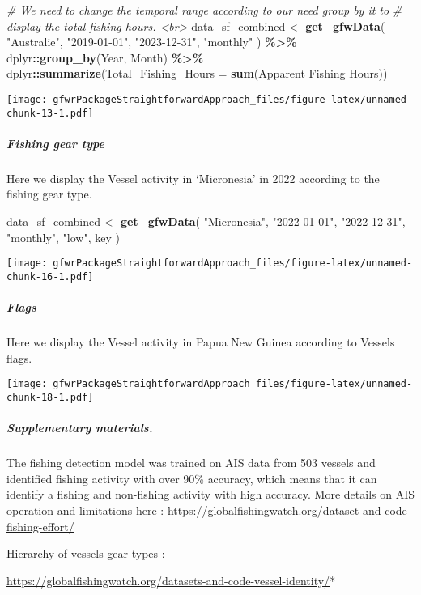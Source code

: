 \documentclass[
]{article}
\newenvironment{Shaded}{\begin{snugshade}}{\end{snugshade}}
\newcommand{\AttributeTok}[1]{\textcolor[rgb]{0.13,0.29,0.53}{#1}}
\newcommand{\CommentTok}[1]{\textcolor[rgb]{0.56,0.35,0.01}{\textit{#1}}}
\newcommand{\FunctionTok}[1]{\textcolor[rgb]{0.13,0.29,0.53}{\textbf{#1}}}
\newcommand{\NormalTok}[1]{#1}
\newcommand{\OtherTok}[1]{\textcolor[rgb]{0.56,0.35,0.01}{#1}}
\newcommand{\SpecialCharTok}[1]{\textcolor[rgb]{0.81,0.36,0.00}{\textbf{#1}}}
\newcommand{\StringTok}[1]{\textcolor[rgb]{0.31,0.60,0.02}{#1}}
\begin{document}
\begin{Shaded}
\begin{Highlighting}[]
\CommentTok{\# We need to change the temporal range according to our need group by it to}
\CommentTok{\# display the total fishing hours. \textless{}br\textgreater{}}
\NormalTok{data\_sf\_combined }\OtherTok{\textless{}{-}} \FunctionTok{get\_gfwData}\NormalTok{(}
  \StringTok{"Australie"}\NormalTok{,}
  \StringTok{"2019{-}01{-}01"}\NormalTok{,}
  \StringTok{"2023{-}12{-}31"}\NormalTok{,}
  \StringTok{"monthly"}
\NormalTok{) }\SpecialCharTok{\%\textgreater{}\%}
\NormalTok{  dplyr}\SpecialCharTok{::}\FunctionTok{group\_by}\NormalTok{(Year, Month) }\SpecialCharTok{\%\textgreater{}\%}
\NormalTok{  dplyr}\SpecialCharTok{::}\FunctionTok{summarize}\NormalTok{(}\AttributeTok{Total\_Fishing\_Hours =} \FunctionTok{sum}\NormalTok{(}\StringTok{\textasciigrave{}}\AttributeTok{Apparent Fishing Hours}\StringTok{\textasciigrave{}}\NormalTok{))}
\end{Highlighting}
\end{Shaded}

\texttt{[image: gfwrPackageStraightforwardApproach\_files/figure-latex/unnamed-chunk-13-1.pdf]}

\hypertarget{fishing-gear-type}{%
\subparagraph{Fishing gear type}\label{fishing-gear-type}}

Here we display the Vessel activity in `Micronesia' in 2022 according to
the fishing gear type.

\begin{Shaded}
\begin{Highlighting}[]
\NormalTok{data\_sf\_combined }\OtherTok{\textless{}{-}} \FunctionTok{get\_gfwData}\NormalTok{(}
  \StringTok{"Micronesia"}\NormalTok{,}
  \StringTok{"2022{-}01{-}01"}\NormalTok{,}
  \StringTok{"2022{-}12{-}31"}\NormalTok{,}
  \StringTok{"monthly"}\NormalTok{,}
  \StringTok{"low"}\NormalTok{,}
\NormalTok{  key}
\NormalTok{)}
\end{Highlighting}
\end{Shaded}

\texttt{[image: gfwrPackageStraightforwardApproach\_files/figure-latex/unnamed-chunk-16-1.pdf]}

\hypertarget{flags}{%
\subparagraph{Flags}\label{flags}}

Here we display the Vessel activity in Papua New Guinea according to
Vessels flags.

\texttt{[image: gfwrPackageStraightforwardApproach\_files/figure-latex/unnamed-chunk-18-1.pdf]}

\hypertarget{supplementary-materials.}{%
\subparagraph{Supplementary materials.}\label{supplementary-materials.}}

The fishing detection model was trained on AIS data from 503 vessels and
identified fishing activity with over 90\% accuracy, which means that it
can identify a fishing and non-fishing activity with high accuracy. More
details on AIS operation and limitations here :
\url{https://globalfishingwatch.org/dataset-and-code-fishing-effort/}

Hierarchy of vessels gear types :

\url{https://globalfishingwatch.org/datasets-and-code-vessel-identity/}*
\end{document}
